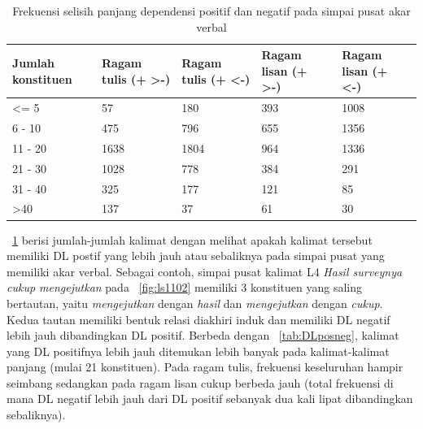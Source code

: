 \begin{table}
\begin{center}
\begin{small}
\caption{Frekuensi selisih panjang dependensi positif dan negatif pada simpai pusat akar verbal}  \label{tab:DLpusatposneg}
\begin{tabular}{ | p{2cm} | p{2cm} | p{2cm} | p{2cm} | p{2cm} |}
    \hline
Jumlah konstituen & Ragam tulis (+ \textgreater -) & Ragam tulis (+ \textless -) & Ragam lisan (+ \textgreater -) & Ragam lisan (+ \textless -) \\ \hline
\textless= 5 	& 57	 	& 180 	& 393 & 1008 \\ \hline
6 - 10 		& 475 	& 796	& 655 & 1356 \\ \hline
11 - 20 		& 1638	& 1804	& 964 & 1336 \\ \hline
21 - 30 		& 1028	& 778	& 384 & 291 \\ \hline
31 - 40 		& 325	& 177	& 121 & 85 \\ \hline
\textgreater 40 	& 137	& 37	 	& 61 & 30 \\ \hline
   \end{tabular}
   \end{small}
\end{center}
\end{table}

\tab~\ref{tab:DLpusatposneg} berisi jumlah-jumlah kalimat dengan melihat apakah kalimat tersebut memiliki DL postif yang lebih jauh atau sebaliknya pada simpai pusat yang memiliki akar verbal. Sebagai contoh, simpai pusat kalimat L4 \textit{Hasil surveynya cukup mengejutkan} pada \pic~\ref{fig:ls1102} memiliki 3 konstituen yang saling bertautan, yaitu \textit{mengejutkan} dengan \textit{hasil} dan \textit{mengejutkan} dengan \textit{cukup}. Kedua tautan memiliki bentuk relasi diakhiri induk dan memiliki DL negatif lebih jauh dibandingkan DL positif. Berbeda dengan \tab~\ref{tab:DLposneg}, kalimat yang DL positifnya lebih jauh ditemukan lebih banyak pada kalimat-kalimat panjang (mulai 21 konstituen). Pada ragam tulis, frekuensi keseluruhan hampir seimbang sedangkan pada ragam lisan cukup berbeda jauh (total frekuensi di mana DL negatif lebih jauh dari DL positif sebanyak dua kali lipat dibandingkan sebaliknya). 

